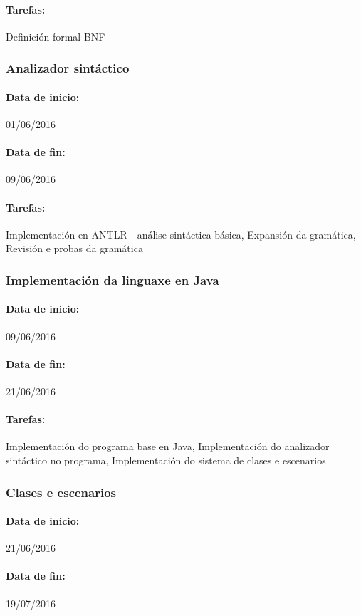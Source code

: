 \paragraph{Tarefas:} Definición formal BNF

\subsubsection{Analizador sintáctico}
\paragraph{Data de inicio:} 01/06/2016
\paragraph{Data de fin:} 09/06/2016
\paragraph{Tarefas:} Implementación en ANTLR - análise sintáctica básica,
Expansión da gramática, Revisión e probas da gramática

\subsubsection{Implementación da linguaxe en Java}
\paragraph{Data de inicio:} 09/06/2016
\paragraph{Data de fin:} 21/06/2016
\paragraph{Tarefas:} Implementación do programa base en Java, Implementación do
analizador sintáctico no programa, Implementación do sistema de clases e
escenarios

\subsubsection{Clases e escenarios}
\paragraph{Data de inicio:} 21/06/2016
\paragraph{Data de fin:} 19/07/2016
